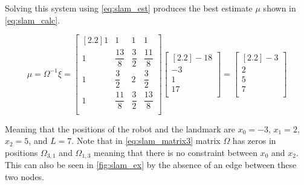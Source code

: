 Solving this system using \autoref{eq:slam_est} produces the best estimate $\mu$ shown in \autoref{eq:slam_calc}.

\begin{equation}
\label{eq:slam_calc}
\mu = \Omega^{-1}\xi = 
\begin{bmatrix}[2.2]
1 & 1 & 1 & 1 \\
1 & \dfrac{13}{8} & \dfrac{3}{2} & \dfrac{11}{8} \\
1 & \dfrac{3}{2} & 2 & \dfrac{3}{2} \\
1 & \dfrac{11}{8} & \dfrac{3}{2} & \dfrac{13}{8} \\
\end{bmatrix}
\begin{bmatrix}[2.2]
-18 \\
-3 \\
1 \\
17 \\
\end{bmatrix} =
\begin{bmatrix}[2.2]
-3 \\
2 \\
5 \\
7 \\
\end{bmatrix}
\end{equation}

Meaning that the positions of the robot and the landmark are $x_0 = -3$, $x_1 = 2$, $x_2 = 5$, and $L = 7$. Note that in \autoref{eq:slam_matrix3} matrix $\Omega$ has zeros in positions $\Omega_{3,1}$ and $\Omega_{1,3}$ meaning that there is no constraint between $x_0$ and $x_2$. This can also be seen in \autoref{fig:slam_ex} by the absence of an edge between these two nodes.
